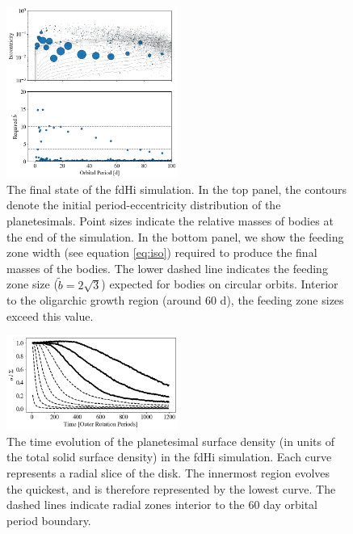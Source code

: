 \documentclass[twocolumn]{aastex63}
\begin{document}

\begin{figure}
\begin{center}
    \includegraphics[width=0.5\textwidth]{figures/fulldisk_e_m_b.png}
    \caption{The final state of the fdHi simulation. In the top panel,
      the contours denote the initial period-eccentricity distribution
      of the planetesimals. Point sizes indicate the relative masses
      of bodies at the end of the simulation. In the bottom panel, we show the
      feeding zone width (see equation \ref{eq:iso}) required to produce
      the final masses of the bodies. The lower dashed line indicates the feeding
      zone size ($\tilde{b} = 2 \sqrt{3}$) expected for bodies on
      circular orbits.
      Interior to the oligarchic
      growth region (around 60 d), the feeding zone sizes exceed this value.\label{fig:fulldisk_e_m}}
\end{center}
\end{figure}

\begin{figure}
\begin{center}
    \includegraphics[width=0.5\textwidth]{figures/pl_frac_time.png}
    \caption{The time evolution of the planetesimal surface density (in units of the total solid surface density) in the fdHi 
    simulation. Each curve represents a radial slice of the disk. The innermost region evolves the quickest, and is therefore 
    represented by the lowest curve. The dashed lines indicate radial zones interior to the 60 day orbital period boundary.\label{fig:pl_frac_time}}
\end{center}
\end{figure}
\end{document}
